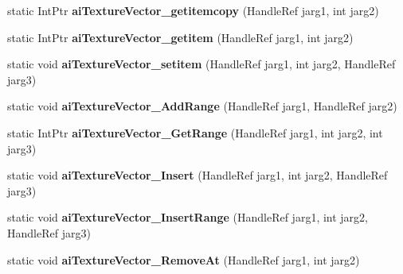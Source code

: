 \begin{DoxyCompactItemize}
\item 
\hypertarget{class_assimp_p_i_n_v_o_k_e_a9078c96530abe6d34d5eaf5a93593073}{static Int\+Ptr {\bfseries ai\+Texture\+Vector\+\_\+getitemcopy} (Handle\+Ref jarg1, int jarg2)}\label{class_assimp_p_i_n_v_o_k_e_a9078c96530abe6d34d5eaf5a93593073}

\item 
\hypertarget{class_assimp_p_i_n_v_o_k_e_a7c943a4f367ccfd6a2798c002bf74e81}{static Int\+Ptr {\bfseries ai\+Texture\+Vector\+\_\+getitem} (Handle\+Ref jarg1, int jarg2)}\label{class_assimp_p_i_n_v_o_k_e_a7c943a4f367ccfd6a2798c002bf74e81}

\item 
\hypertarget{class_assimp_p_i_n_v_o_k_e_a2d21aefd8b5037794d91d9e761877f79}{static void {\bfseries ai\+Texture\+Vector\+\_\+setitem} (Handle\+Ref jarg1, int jarg2, Handle\+Ref jarg3)}\label{class_assimp_p_i_n_v_o_k_e_a2d21aefd8b5037794d91d9e761877f79}

\item 
\hypertarget{class_assimp_p_i_n_v_o_k_e_a6b7921dffd072f4d3a5e7e0c9c6989f7}{static void {\bfseries ai\+Texture\+Vector\+\_\+\+Add\+Range} (Handle\+Ref jarg1, Handle\+Ref jarg2)}\label{class_assimp_p_i_n_v_o_k_e_a6b7921dffd072f4d3a5e7e0c9c6989f7}

\item 
\hypertarget{class_assimp_p_i_n_v_o_k_e_a9e0a165f6f9535e8416ee3cdc053f861}{static Int\+Ptr {\bfseries ai\+Texture\+Vector\+\_\+\+Get\+Range} (Handle\+Ref jarg1, int jarg2, int jarg3)}\label{class_assimp_p_i_n_v_o_k_e_a9e0a165f6f9535e8416ee3cdc053f861}

\item 
\hypertarget{class_assimp_p_i_n_v_o_k_e_a710fbaad53c9eddb1291ea7b12ce6c2e}{static void {\bfseries ai\+Texture\+Vector\+\_\+\+Insert} (Handle\+Ref jarg1, int jarg2, Handle\+Ref jarg3)}\label{class_assimp_p_i_n_v_o_k_e_a710fbaad53c9eddb1291ea7b12ce6c2e}

\item 
\hypertarget{class_assimp_p_i_n_v_o_k_e_ab996769321254dff0dcdf92a12cc2901}{static void {\bfseries ai\+Texture\+Vector\+\_\+\+Insert\+Range} (Handle\+Ref jarg1, int jarg2, Handle\+Ref jarg3)}\label{class_assimp_p_i_n_v_o_k_e_ab996769321254dff0dcdf92a12cc2901}

\item 
\hypertarget{class_assimp_p_i_n_v_o_k_e_a5ff7c9cfe12743269de48dad5fe199dd}{static void {\bfseries ai\+Texture\+Vector\+\_\+\+Remove\+At} (Handle\+Ref jarg1, int jarg2)}\label{class_assimp_p_i_n_v_o_k_e_a5ff7c9cfe12743269de48dad5fe199dd}


\end{DoxyCompactItemize}
